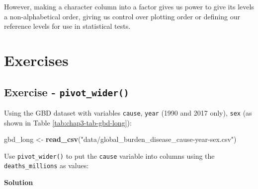 \documentclass[
  12pt,
  krantz2]{krantz}
\makeatletter
\newenvironment{Shaded}{\begin{snugshade}}{\end{snugshade}}
\newcommand{\KeywordTok}[1]{\textcolor[rgb]{0.13,0.29,0.53}{\textbf{#1}}}
\newcommand{\NormalTok}[1]{#1}
\newcommand{\StringTok}[1]{\textcolor[rgb]{0.31,0.60,0.02}{#1}}
\newenvironment{kframe}{%
\medskip{}
\setlength{\fboxsep}{.8em}
 \def\at@end@of@kframe{}%
 \ifinner\ifhmode%
  \def\at@end@of@kframe{\end{minipage}}%
  \begin{minipage}{\columnwidth}%
 \fi\fi%
 \def\FrameCommand##1{\hskip\@totalleftmargin \hskip-\fboxsep
 \colorbox{shadecolor}{##1}\hskip-\fboxsep
     \hskip-\linewidth \hskip-\@totalleftmargin \hskip\columnwidth}%
 \MakeFramed {\advance\hsize-\width
   \@totalleftmargin\z@ \linewidth\hsize
   \@setminipage}}%
 {\par\unskip\endMakeFramed%
 \at@end@of@kframe}
\renewenvironment{Shaded}{\begin{kframe}}{\end{kframe}}
\makeatother
\begin{document}
However, making a character column into a factor gives us power to give its levels a non-alphabetical order, giving us control over plotting order or defining our reference levels for use in statistical tests.

\hypertarget{exercises}{%
\section{Exercises}\label{exercises}}

\hypertarget{exercise---pivot_wider}{%
\subsection{\texorpdfstring{Exercise - \texttt{pivot\_wider()}}{Exercise - pivot\_wider()}}\label{exercise---pivot_wider}}

Using the GBD dataset with variables \texttt{cause}, \texttt{year} (1990 and 2017 only), \texttt{sex} (as shown in Table \ref{tab:chap3-tab-gbd-long}):

\begin{Shaded}
\begin{Highlighting}[]
\NormalTok{gbd_long <-}\StringTok{ }\KeywordTok{read_csv}\NormalTok{(}\StringTok{"data/global_burden_disease_cause-year-sex.csv"}\NormalTok{)}
\end{Highlighting}
\end{Shaded}

Use \texttt{pivot\_wider()} to put the \texttt{cause} variable into columns using the \texttt{deaths\_millions} as values:

\begin{table}[!h]

\caption{\label{tab:unnamed-chunk-38}Exercise: putting the cause variable into the wide format.}
\centering
{}
\end{table}

\textbf{Solution}
\end{document}
